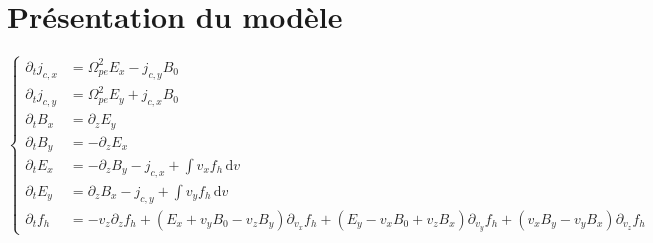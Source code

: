 
\section{Présentation du modèle}

$$
  \begin{cases}
    \partial_t j_{c,x} &= \Omega_{pe}^2E_x - j_{c,y}B_0 \\
    \partial_t j_{c,y} &= \Omega_{pe}^2E_y + j_{c,x}B_0 \\
    \partial_t B_{x}   &=  \partial_zE_y \\
    \partial_t B_{y}   &= -\partial_zE_x \\
    \partial_t E_{x}   &= -\partial_zB_y - j_{c,x} + \int v_xf_h\,\mathrm{d}v \\
    \partial_t E_{y}   &=  \partial_zB_x - j_{c,y} + \int v_yf_h\,\mathrm{d}v \\
    \partial_t f_h     &= -v_z\partial_zf_h + (E_x+v_yB_0-v_zB_y)\partial_{v_x}f_h + (E_y-v_xB_0+v_zB_x)\partial_{v_y}f_h + (v_xB_y - v_yB_x)\partial_{v_z}f_h
  \end{cases}
$$
